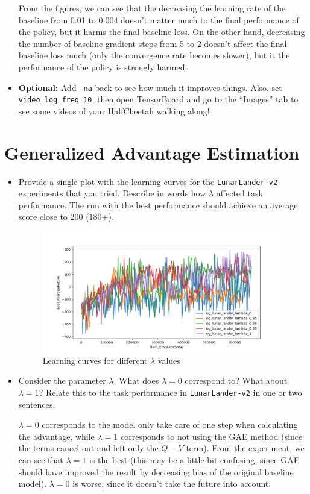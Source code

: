\documentclass{article}
\begin{document}
\begin{itemize}
From the figures, we can see that the decreasing the learning rate of the baseline from 0.01 to 0.004 doesn't matter much to the final performance of the policy, but it harms the final baseline loss. On the other hand, decreasing the number of baseline gradient steps from 5 to 2 doesn't affect the final baseline loss much (only the convergence rate becomes slower), but it the performance of the policy is strongly harmed.

        \item \textbf{Optional:} Add \verb|-na| back to see how much it improves things. Also, set \verb|video_log_freq 10|, then open TensorBoard and go to the ``Images'' tab to see some videos of your HalfCheetah walking along!
\end{itemize}

\newpage\section{Generalized Advantage Estimation}
\begin{itemize}
        \item Provide a single plot with the learning curves for the \verb|LunarLander-v2| experiments that you tried. Describe in words how $\lambda$ affected task performance. The run with the best performance should achieve an average score close to 200 (180+).

\MYSOLUTION

\begin{figure}[H]
        \centering
        \includegraphics[width=0.9\linewidth]{./report/assets/E3_all.png} %
        \caption{Learning curves for different $\lambda$ values}
        \label{fig:E3}
\end{figure}
        \item Consider the parameter $\lambda$. What does $\lambda = 0$ correspond to? What about $\lambda = 1$? Relate this to the task performance in \verb|LunarLander-v2| in one or two sentences.
        
\MYSOLUTION

$\lambda=0$ corresponds to the model only take care of one step when calculating the advantage, while $\lambda=1$ corresponds to not using the GAE method (since the terms cancel out and left only the $Q-V$ term). From the experiment, we can see that $\lambda=1$ is the best (this may be a little bit confusing, since GAE should have improved the result by decreasing bias of the original baseline model). $\lambda=0$ is worse, since it doesn't take the future into account.

\end{itemize}
\end{document}

